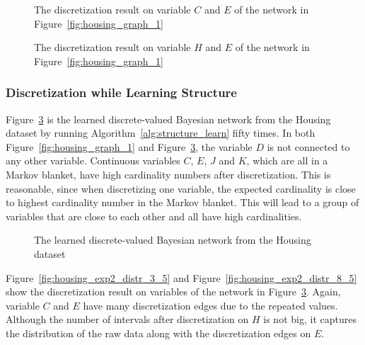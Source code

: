 \begin{figure}[ht]
      
  \caption{The discretization result on variable $C$ and $E$ of the network in Figure~\ref{fig:housing_graph_1}}
  \label{fig:housing_exp1_distr_3_5}
\end{figure}

\begin{figure}[ht]
      
  \caption{The discretization result on variable $H$ and $E$ of the network in Figure~\ref{fig:housing_graph_1}}
  \label{fig:housing_exp1_distr_8_5}
\end{figure}

\subsubsection{Discretization while Learning Structure}
\label{subsubsec:housing_exp2}

Figure~\ref{fig:housing_graph_2} is the learned discrete-valued Bayesian network from the Housing dataset by running Algorithm~\ref{alg:structure_learn} fifty times.
In both Figure~\ref{fig:housing_graph_1} and Figure~\ref{fig:housing_graph_2}, the variable $D$ is not connected to any other variable.
Continuous variables $C$, $E$, $J$ and $K$, which are all in a Markov blanket, have high cardinality numbers after discretization.
This is reasonable, since when discretizing one variable, the expected cardinality is close to highest cardinality number in the Markov blanket.
This will lead to a group of variables that are close to each other and all have high cardinalities.

\begin{figure}[ht]
      
  \caption{The learned discrete-valued Bayesian network from the Housing dataset
  }
  \label{fig:housing_graph_2}
\end{figure}

Figure~\ref{fig:housing_exp2_distr_3_5} and Figure~\ref{fig:housing_exp2_distr_8_5} show the discretization result on variables of the network in Figure~\ref{fig:housing_graph_2}.
Again, variable $C$ and $E$ have many discretization edges due to the repeated values.
Although the number of intervals after discretization on $H$ is not big, it captures the distribution of the raw data along with the discretization edges on $E$.

